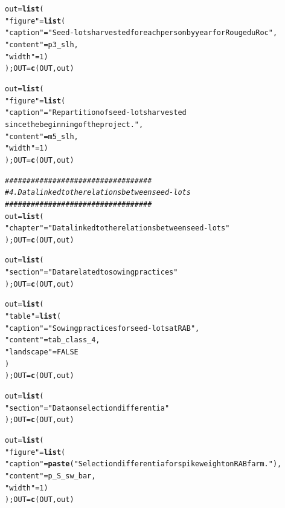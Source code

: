\documentclass{article}\usepackage[]{graphicx}\usepackage[]{color}
\makeatletter
\newcommand{\hlnum}[1]{\textcolor[rgb]{0.686,0.059,0.569}{#1}}%
\newcommand{\hlstr}[1]{\textcolor[rgb]{0.192,0.494,0.8}{#1}}%
\newcommand{\hlcom}[1]{\textcolor[rgb]{0.678,0.584,0.686}{\textit{#1}}}%
\newcommand{\hlstd}[1]{\textcolor[rgb]{0.345,0.345,0.345}{#1}}%
\newcommand{\hlkwb}[1]{\textcolor[rgb]{0.69,0.353,0.396}{#1}}%
\newcommand{\hlkwd}[1]{\textcolor[rgb]{0.737,0.353,0.396}{\textbf{#1}}}%
\newenvironment{kframe}{%
 \def\at@end@of@kframe{}%
 \ifinner\ifhmode%
  \def\at@end@of@kframe{\end{minipage}}%
  \begin{minipage}{\columnwidth}%
 \fi\fi%
 \def\FrameCommand##1{\hskip\@totalleftmargin \hskip-\fboxsep
 \colorbox{shadecolor}{##1}\hskip-\fboxsep
     \hskip-\linewidth \hskip-\@totalleftmargin \hskip\columnwidth}%
 \MakeFramed {\advance\hsize-\width
   \@totalleftmargin\z@ \linewidth\hsize
   \@setminipage}}%
 {\par\unskip\endMakeFramed%
 \at@end@of@kframe}
\newenvironment{knitrout}{}{} %
\makeatother
\begin{document}
\begin{knitrout}
\begin{kframe}
\begin{alltt}
\hlstd{out} \hlkwb{=} \hlkwd{list}\hlstd{(}
        \hlstr{"figure"} \hlstd{=} \hlkwd{list}\hlstd{(}
                \hlstr{"caption"} \hlstd{=} \hlstr{"Seed-lots harvested for each person by year for Rouge du Roc"}\hlstd{,}
                \hlstr{"content"} \hlstd{= p3_slh,}
                \hlstr{"width"} \hlstd{=} \hlnum{1}\hlstd{)}
        \hlstd{); OUT} \hlkwb{=} \hlkwd{c}\hlstd{(OUT, out)}

\hlstd{out} \hlkwb{=} \hlkwd{list}\hlstd{(}
        \hlstr{"figure"} \hlstd{=} \hlkwd{list}\hlstd{(}
                \hlstr{"caption"} \hlstd{=} \hlstr{"Repartition of seed-lots harvested 
		since the beginning of the project."}\hlstd{,}
                \hlstr{"content"} \hlstd{= m5_slh,}
                \hlstr{"width"} \hlstd{=} \hlnum{1}\hlstd{)}
        \hlstd{); OUT} \hlkwb{=} \hlkwd{c}\hlstd{(OUT, out)}


\hlcom{##################################}
\hlcom{# 4. Data linked to the relations between seed-lots}
\hlcom{##################################}
\hlstd{out} \hlkwb{=} \hlkwd{list}\hlstd{(}
        \hlstr{"chapter"} \hlstd{=} \hlstr{"Data linked to the relations between seed-lots"}
        \hlstd{); OUT} \hlkwb{=} \hlkwd{c}\hlstd{(OUT, out)}


\hlstd{out} \hlkwb{=} \hlkwd{list}\hlstd{(}
        \hlstr{"section"} \hlstd{=} \hlstr{"Data related to sowing practices"}
        \hlstd{); OUT} \hlkwb{=} \hlkwd{c}\hlstd{(OUT, out)}

\hlstd{out} \hlkwb{=} \hlkwd{list}\hlstd{(}
        \hlstr{"table"} \hlstd{=} \hlkwd{list}\hlstd{(}
                \hlstr{"caption"} \hlstd{=} \hlstr{"Sowing practices for seed-lots at RAB"}\hlstd{,}
                \hlstr{"content"} \hlstd{= tab_class_4,}
                \hlstr{"landscape"} \hlstd{=} \hlnum{FALSE}
                \hlstd{)}
        \hlstd{); OUT} \hlkwb{=} \hlkwd{c}\hlstd{(OUT, out)}


\hlstd{out} \hlkwb{=} \hlkwd{list}\hlstd{(}
        \hlstr{"section"} \hlstd{=} \hlstr{"Data on selection differentia"}
        \hlstd{); OUT} \hlkwb{=} \hlkwd{c}\hlstd{(OUT, out)}

\hlstd{out} \hlkwb{=} \hlkwd{list}\hlstd{(}
        \hlstr{"figure"} \hlstd{=} \hlkwd{list}\hlstd{(}
                \hlstr{"caption"} \hlstd{=} \hlkwd{paste}\hlstd{(}\hlstr{"Selection differentia for spike weight on RAB farm."}\hlstd{),}
                \hlstr{"content"} \hlstd{= p_S_sw_bar,}
                \hlstr{"width"} \hlstd{=} \hlnum{1}\hlstd{)}
        \hlstd{); OUT} \hlkwb{=} \hlkwd{c}\hlstd{(OUT, out)}


\end{alltt}
\end{kframe}
\end{knitrout}
\end{document}
